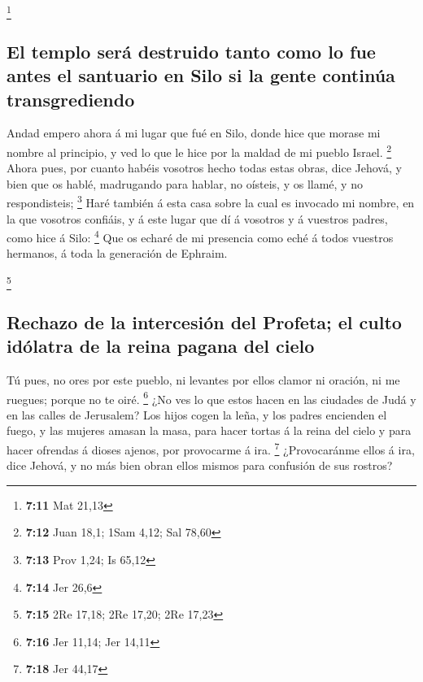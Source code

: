 \footnote{\textbf{7:11} Mat 21,13}

\hypertarget{el-templo-seruxe1-destruido-tanto-como-lo-fue-antes-el-santuario-en-silo-si-la-gente-continuxfaa-transgrediendo}{%
\subsection{El templo será destruido tanto como lo fue antes el
santuario en Silo si la gente continúa
transgrediendo}\label{el-templo-seruxe1-destruido-tanto-como-lo-fue-antes-el-santuario-en-silo-si-la-gente-continuxfaa-transgrediendo}}

 Andad empero ahora á mi lugar que fué en Silo, donde hice
que morase mi nombre al principio, y ved lo que le hice por la maldad de
mi pueblo Israel. \footnote{\textbf{7:12} Juan 18,1; 1Sam 4,12; Sal
  78,60}  Ahora pues, por cuanto habéis vosotros hecho
todas estas obras, dice Jehová, y bien que os hablé, madrugando para
hablar, no oísteis, y os llamé, y no respondisteis; \footnote{\textbf{7:13}
  Prov 1,24; Is 65,12}  Haré también á esta casa sobre la
cual es invocado mi nombre, en la que vosotros confiáis, y á este lugar
que dí á vosotros y á vuestros padres, como hice á Silo: \footnote{\textbf{7:14}
  Jer 26,6}  Que os echaré de mi presencia como eché á
todos vuestros hermanos, á toda la generación de Ephraim.

\footnote{\textbf{7:15} 2Re 17,18; 2Re 17,20; 2Re 17,23}

\hypertarget{rechazo-de-la-intercesiuxf3n-del-profeta-el-culto-iduxf3latra-de-la-reina-pagana-del-cielo}{%
\subsection{Rechazo de la intercesión del Profeta; el culto idólatra de
la reina pagana del
cielo}\label{rechazo-de-la-intercesiuxf3n-del-profeta-el-culto-iduxf3latra-de-la-reina-pagana-del-cielo}}

 Tú pues, no ores por este pueblo, ni levantes por ellos
clamor ni oración, ni me ruegues; porque no te oiré. \footnote{\textbf{7:16}
  Jer 11,14; Jer 14,11}  ¿No ves lo que estos hacen en las
ciudades de Judá y en las calles de Jerusalem?  Los hijos
cogen la leña, y los padres encienden el fuego, y las mujeres amasan la
masa, para hacer tortas á la reina del cielo y para hacer ofrendas á
dioses ajenos, por provocarme á ira. \footnote{\textbf{7:18} Jer 44,17}
 ¿Provocaránme ellos á ira, dice Jehová, y no más bien
obran ellos mismos para confusión de sus rostros?

